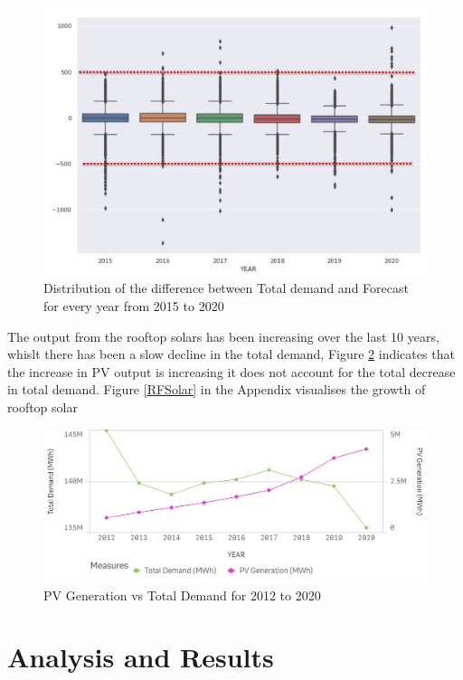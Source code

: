 \documentclass[mstat,12pt]{unswthesis}
\begin{document}
\begin{figure}[H]
\includegraphics[width=140mm]{image200.jpg}
\caption{Distribution of the difference between Total demand and Forecast for every year from 2015 to 2020}
\label{demandvtempbox1}
\end{figure}

The output from the rooftop solars has been increasing over the last 10
years, whislt there has been a slow decline in the total demand, Figure
\ref{rtsolar} indicates that the increase in PV output is increasing it
does not account for the total decrease in total demand. Figure
\ref{RFSolar} in the Appendix visualises the growth of rooftop solar

\begin{figure}[H]
\includegraphics[width=140mm]{image3.png}
\caption{PV Generation vs Total Demand for 2012 to 2020}
\label{rtsolar}
\end{figure}

\hypertarget{analysis-and-results}{%
\chapter{Analysis and Results}\label{analysis-and-results}}
\end{document}

